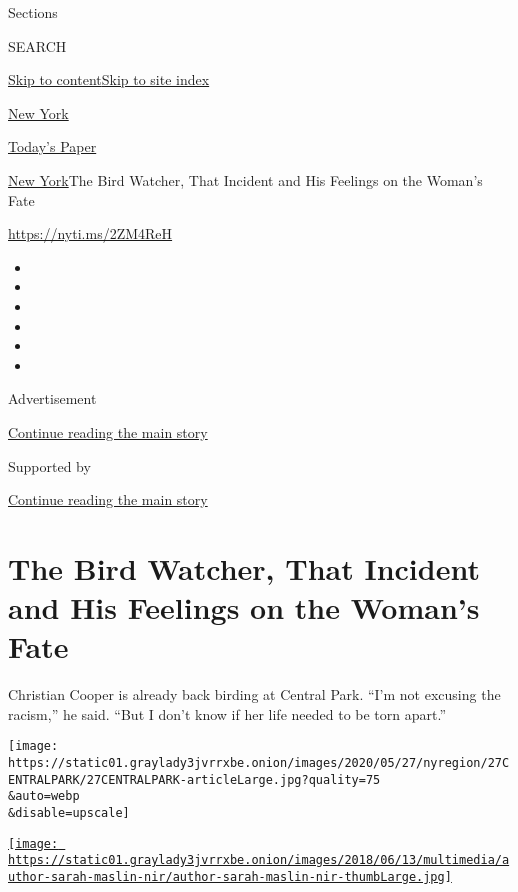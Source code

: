 Sections

SEARCH

\protect\hyperlink{site-content}{Skip to
content}\protect\hyperlink{site-index}{Skip to site index}

\href{https://www.nytimes3xbfgragh.onion/section/nyregion}{New York}

\href{https://myaccount.nytimes3xbfgragh.onion/auth/login?response_type=cookie\&client_id=vi}{}

\href{https://www.nytimes3xbfgragh.onion/section/todayspaper}{Today's
Paper}

\href{/section/nyregion}{New York}\textbar{}The Bird Watcher, That
Incident and His Feelings on the Woman's Fate

\url{https://nyti.ms/2ZM4ReH}

\begin{itemize}
\item
\item
\item
\item
\item
\item
\end{itemize}

Advertisement

\protect\hyperlink{after-top}{Continue reading the main story}

Supported by

\protect\hyperlink{after-sponsor}{Continue reading the main story}

\hypertarget{the-bird-watcher-that-incident-and-his-feelings-on-the-womans-fate}{%
\section{The Bird Watcher, That Incident and His Feelings on the Woman's
Fate}\label{the-bird-watcher-that-incident-and-his-feelings-on-the-womans-fate}}

Christian Cooper is already back birding at Central Park. ``I'm not
excusing the racism,'' he said. ``But I don't know if her life needed to
be torn apart.''

\texttt{[image: https://static01.graylady3jvrrxbe.onion/images/2020/05/27/nyregion/27CENTRALPARK/27CENTRALPARK-articleLarge.jpg?quality=75\\\&auto=webp\\\&disable=upscale]}

\href{https://www.nytimes3xbfgragh.onion/by/sarah-maslin-nir}{\texttt{[image: https://static01.graylady3jvrrxbe.onion/images/2018/06/13/multimedia/author-sarah-maslin-nir/author-sarah-maslin-nir-thumbLarge.jpg]}}

